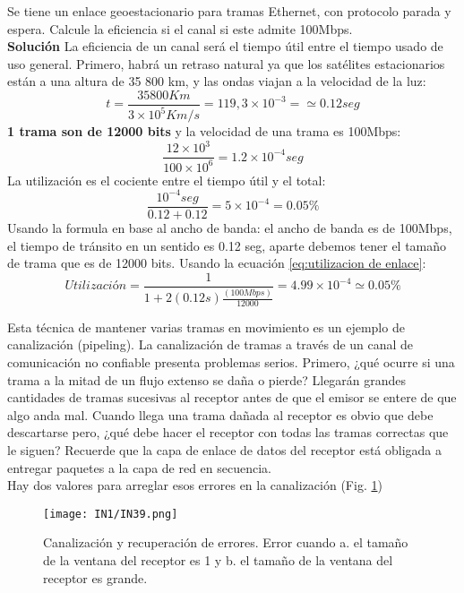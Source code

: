 \documentclass[
	12pt, %
	fleqn, %
	a4paper, %
	oneside, %
]{LegrandOrangeBook}
\begin{document}
\begin{example}
Se tiene un enlace geoestacionario para tramas Ethernet, con protocolo parada y espera. Calcule la eficiencia si el canal si este admite 100Mbps.\\
\textbf{Solución}
La eficiencia de un canal será el tiempo útil entre el  tiempo usado de uso general.
Primero, habrá un retraso natural ya que los satélites estacionarios están a una altura de 35 800 km, y las ondas viajan a la velocidad de la luz:
\begin{displaymath}
t=\frac{35800 Km}{3\times 10^5 Km/s}=119,3\times 10^{-3}=\simeq 0.12 seg
\end{displaymath}
\textbf{1 trama son de 12000 bits} y la velocidad de una trama es 100Mbps:
\begin{displaymath}
\frac{12\times 10^3}{100\times 10^6}=1.2\times 10^{-4}seg
\end{displaymath}
La utilización es el cociente entre el tiempo útil y el total:
\begin{displaymath}
\frac{10^{-4}seg}{0.12+0.12}=5\times 10^{-4}=0.05\%
\end{displaymath}
Usando la formula en base al ancho de banda: el ancho de banda es de 100Mbps, el tiempo de tránsito en un sentido es 0.12 seg, aparte debemos tener el tamaño de trama que es de 12000 bits. Usando la ecuación \ref{eq:utilizacion de enlace}:
\begin{displaymath}
Utilización=\frac{1}{1+2(0.12s)\frac{(100Mbps)}{12000}}=4.99\times 10^{-4}\simeq 0.05\%
\end{displaymath}
\end{example}
Esta técnica de mantener varias tramas en movimiento es un ejemplo de canalización (pipeling). La canalización de tramas a través de un canal de comunicación no confiable presenta problemas serios. Primero, ¿qué ocurre si una trama a la mitad de un flujo extenso se daña o pierde? Llegarán grandes cantidades de tramas sucesivas al receptor antes de que el emisor se entere de que algo anda mal. Cuando llega una trama dañada al receptor es obvio que debe descartarse pero, ¿qué debe hacer el receptor con todas las tramas correctas que le siguen? Recuerde que la capa de enlace de datos del receptor está obligada a entregar paquetes a la capa de red en secuencia.\\
Hay dos valores para arreglar esos errores en la canalización (Fig. \ref{fig: canalización})
\begin{figure}[]
\centering
\texttt{[image: IN1/IN39.png]}
\caption{Canalización y recuperación de errores. Error cuando a. el tamaño de la ventana del receptor es 1 y b. el tamaño de la ventana del receptor es grande.}
\label{fig: canalización}
\end{figure}
\end{document}
